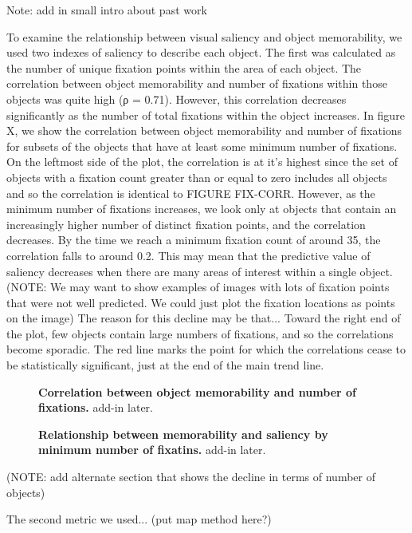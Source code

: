 Note: add in small intro about past work

To examine the relationship between visual saliency and object memorability, we used two indexes of saliency to describe each object. The first was calculated as the number of unique fixation points within the area of each object. The correlation between object memorability and number of fixations within those objects was quite high (ρ = 0.71). However, this correlation decreases significantly as the number of total fixations within the object increases. In figure X, we show the correlation between object memorability and number of fixations for subsets of the objects that have at least some minimum number of fixations. On the leftmost side of the plot, the correlation is at it's highest since the set of objects with a fixation count greater than or equal to zero includes all objects and so the correlation is identical to FIGURE FIX-CORR. However, as the minimum number of fixations increases, we look only at objects that contain an increasingly higher number of distinct fixation points, and the correlation decreases. By the time we reach a minimum fixation count of around 35, the correlation falls to around 0.2. This may mean that the predictive value of saliency decreases when there are many areas of interest within a single object. (NOTE: We may want to show examples of images with lots of fixation points that were not well predicted. We could just plot the fixation locations as points on the image) The reason for this decline may be that... Toward the right end of the plot, few objects contain large numbers of fixations, and so the correlations become sporadic. The red line marks the point for which the correlations cease to be statistically significant, just at the end of the main trend line.

\begin{figure}[t]
\centering
{}
\vspace{-5mm}\caption{\footnotesize\textbf{Correlation between object memorability and number of fixations.} add-in later. }\label{fig:exampleStimuli}
\end{figure}

\begin{figure}[t]
\centering
{}
\vspace{-5mm}\caption{\footnotesize\textbf{Relationship between memorability and saliency by minimum number of fixatins.} add-in later. }\label{fig:exampleStimuli}
\end{figure}

(NOTE: add alternate section that shows the decline in terms of number of objects)

The second metric we used... (put map method here?)
